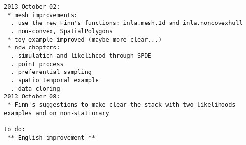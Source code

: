 \begin{verbatim}
2013 October 02:
 * mesh improvements:
  . use the new Finn's functions: inla.mesh.2d and inla.noncovexhull 
  . non-convex, SpatialPolygons 
 * toy-example improved (maybe more clear...) 
 * new chapters: 
  . simulation and likelihood through SPDE
  . point process 
  . preferential sampling 
  . spatio temporal example 
  . data cloning
2013 October 08: 
 * Finn's suggestions to make clear the stack with two likelihoods examples and on non-stationary

to do: 
 ** English improvement ** 

\end{verbatim}
